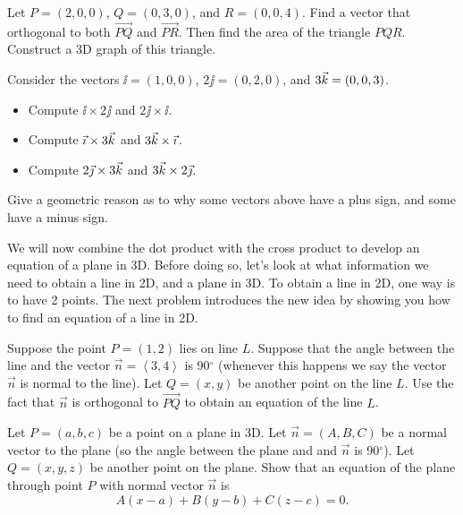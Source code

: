 \begin{problem}  
%
Let $P=(2,0,0)$, $Q=(0,3,0)$, and $R=(0,0,4)$. Find a vector that orthogonal to both $\vec {PQ}$ and $\vec {PR}$. Then find the area of the triangle $PQR$. Construct a 3D graph of this triangle.
\end{problem}

\begin{problem} 
%
Consider the vectors ${\ii}=(1,0,0)$, ${2\jj}=(0,2,0)$, and ${3\vec k}=(0,0,3)$.
\begin{itemize}
\item Compute $\ii\times {2\jj}$ and ${2\jj}\times {\ii}$.
\item Compute ${\vec \imath}\times {3\ensuremath{\vec k}}$ and ${3\vec k}\times {\ensuremath{\vec \imath}}$.
\item Compute ${2\vec \jmath}\times {3\ensuremath{\vec k}}$ and ${3\vec k}\times {2\ensuremath{\vec \jmath}}$.
\end{itemize}
Give a geometric reason as to why some vectors above have a plus sign, and some have a minus sign.
\end{problem}

We will now combine the dot product with the cross product to develop an equation of a plane in 3D. 
Before doing so, let's look at what information we need to obtain a line in 2D, and a plane in 3D.  
To obtain a line in 2D, one way is to have 2 points. 
The next problem introduces the new idea by showing you how to find an equation of a line in 2D. 

\begin{problem}\label{plane equation normal point}
Suppose the point $P=(1,2)$ lies on line $L$. Suppose that the angle between the line and the vector $\vec n=\left<3,4\right>$ is 90$^\circ$ (whenever this happens we say the vector $\vec n$ is normal to the line). Let $Q=(x,y)$ be another point on the line $L$. Use the fact that $\vec n$ is orthogonal to $\vec {PQ}$ to obtain an equation of the line $L$. 
\end{problem}


\begin{problem}\label{plane equation three points}
%
Let $P=(a,b,c)$ be a point on a plane in 3D. Let $\vec n=(A,B,C)$ be a normal vector to the plane (so the angle between the plane and and $\vec n$ is 90$^\circ$).  Let $Q=(x,y,z)$ be another point on the plane.  Show that an equation of the plane through point $P$ with normal vector $\vec n$ is $$A(x-a)+B(y-b)+C(z-c)=0.$$
\end{problem}

